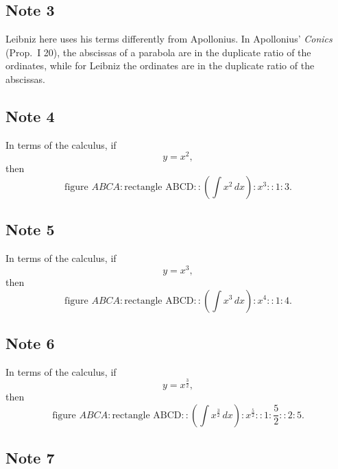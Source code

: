 \documentclass[polutonikogreek,english,twoside,openright]{article}
\begin{document}
\subsection*{Note 3}
\label{ctp3}

Leibniz here uses his terms differently from Apollonius.  In
Apollonius' {\em Conics} (Prop.\ I 20), the abscissas of a parabola
are in the duplicate ratio of the ordinates, while for Leibniz the
ordinates are in the duplicate ratio of the abscissas.

\subsection*{Note 4}
\label{ctp4}

In terms of the calculus, if
$$y = x^2,$$
then
$$\mbox{figure }ABCA \!:\! \mbox{rectangle ABCD} :: \left(\int\! x^2\,dx\right) \!:\! x^3 :: 1\!:\!3.$$

\subsection*{Note 5}
\label{ctp5}

In terms of the calculus, if
$$y = x^3,$$
then
$$\mbox{figure }ABCA \!:\! \mbox{rectangle ABCD} :: \left(\int\! x^3\,dx\right) \!:\! x^4 :: 1\!:\!4.$$

\subsection*{Note 6}
\label{ctp6}

In terms of the calculus, if
$$y = x^{\frac{3}{2}},$$
then
$$\mbox{figure }ABCA \!:\! \mbox{rectangle ABCD} :: \left(\int\! x^{\frac{3}{2}}\,dx\right) \!:\! x^{\frac{5}{2}} :: 1\!:\!\frac{5}{2} :: 2\!:\!5.$$

\subsection*{Note 7}
\label{ctp7}
\end{document}
